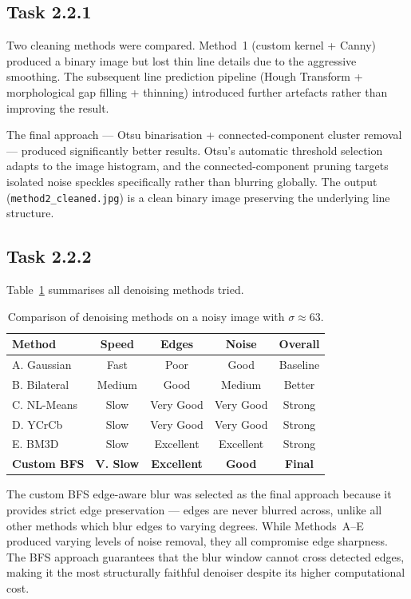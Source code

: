 \documentclass[conference, twocolumn]{IEEEtran}
\begin{document}
\subsection{Task 2.2.1}

Two cleaning methods were compared. Method~1 (custom kernel + Canny) produced a binary image but lost thin line details due to the aggressive smoothing. The subsequent line prediction pipeline (Hough Transform + morphological gap filling + thinning) introduced further artefacts rather than improving the result.

The final approach --- Otsu binarisation + connected-component cluster removal --- produced significantly better results. Otsu's automatic threshold selection adapts to the image histogram, and the connected-component pruning targets isolated noise speckles specifically rather than blurring globally. The output (\texttt{method2\_cleaned.jpg}) is a clean binary image preserving the underlying line structure.

\subsection{Task 2.2.2}

Table~\ref{tab:denoise_comparison} summarises all denoising methods tried.

\begin{table}[H]
\centering
\caption{Comparison of denoising methods on a noisy image with $\sigma \approx 63$.}
\label{tab:denoise_comparison}
\begin{tabular}{@{}lcccc@{}}
\toprule
\textbf{Method} & \textbf{Speed} & \textbf{Edges} & \textbf{Noise} & \textbf{Overall} \\
\midrule
A. Gaussian     & Fast   & Poor      & Good      & Baseline \\
B. Bilateral    & Medium & Good      & Medium    & Better   \\
C. NL-Means     & Slow   & Very Good & Very Good & Strong   \\
D. YCrCb        & Slow   & Very Good & Very Good & Strong   \\
E. BM3D         & Slow   & Excellent & Excellent & Strong   \\
\textbf{Custom BFS} & \textbf{V. Slow} & \textbf{Excellent} & \textbf{Good} & \textbf{Final} \\
\bottomrule
\end{tabular}
\end{table}

The custom BFS edge-aware blur was selected as the final approach because it provides strict edge preservation --- edges are never blurred across, unlike all other methods which blur edges to varying degrees. While Methods~A--E produced varying levels of noise removal, they all compromise edge sharpness. The BFS approach guarantees that the blur window cannot cross detected edges, making it the most structurally faithful denoiser despite its higher computational cost.
\end{document}
